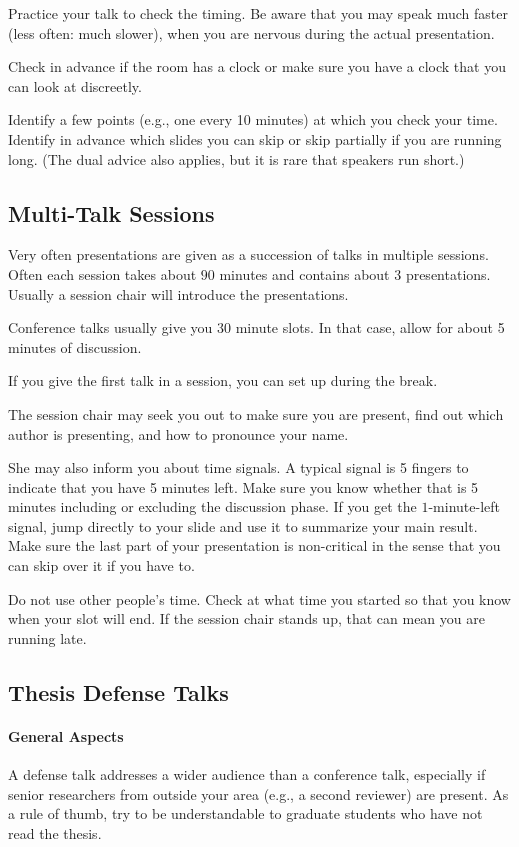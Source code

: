 \documentclass[12pt]{article}
\begin{document}
Practice your talk to check the timing.
Be aware that you may speak much faster (less often: much slower), when you are nervous during the actual presentation.
\medskip

Check in advance if the room has a clock or make sure you have a clock that you can look at discreetly.
\medskip

Identify a few points (e.g., one every 10 minutes) at which you check your time.
Identify in advance which slides you can skip or skip partially if you are running long.
(The dual advice also applies, but it is rare that speakers run short.)

\subsection{Multi-Talk Sessions}

Very often presentations are given as a succession of talks in multiple sessions.
Often each session takes about $90$ minutes and contains about $3$ presentations.
Usually a session chair will introduce the presentations.
\medskip

Conference talks usually give you 30 minute slots.
In that case, allow for about 5 minutes of discussion.
\medskip

If you give the first talk in a session, you can set up during the break.
\medskip

The session chair may seek you out to make sure you are present, find out which author is presenting, and how to pronounce your name.

She may also inform you about time signals.
A typical signal is 5 fingers to indicate that you have 5 minutes left.
Make sure you know whether that is 5 minutes including or excluding the discussion phase.
If you get the $1$-minute-left signal, jump directly to your slide and use it to summarize your main result.
Make sure the last part of your presentation is non-critical in the sense that you can skip over it if you have to.
\medskip

Do not use other people's time.
Check at what time you started so that you know when your slot will end.
If the session chair stands up, that can mean you are running late.

\subsection{Thesis Defense Talks}

\paragraph{General Aspects}
A defense talk addresses a wider audience than a conference talk, especially if senior researchers from outside your area (e.g., a second reviewer) are present.
As a rule of thumb, try to be understandable to graduate students who have not read the thesis.
\medskip
\end{document}
